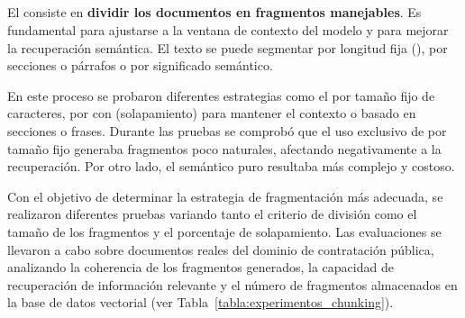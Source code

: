 \subsection{}

El  consiste en \textbf{dividir los documentos en fragmentos manejables}. Es fundamental para ajustarse a la ventana de contexto del modelo y para mejorar la recuperación semántica. El texto se puede segmentar por longitud fija (), por secciones o párrafos o por significado semántico.

En este proceso se probaron diferentes estrategias como el  por tamaño fijo de caracteres, por  con  (solapamiento) para mantener el contexto o basado en secciones o frases. Durante las pruebas se  comprobó que el uso exclusivo de  por tamaño fijo generaba fragmentos poco naturales, afectando negativamente a la recuperación. Por otro lado, el  semántico puro resultaba más complejo y costoso.

Con el objetivo de determinar la estrategia de fragmentación más adecuada, se realizaron diferentes pruebas variando tanto el criterio de división como el tamaño de los fragmentos y el porcentaje de solapamiento. Las evaluaciones se llevaron a cabo sobre documentos reales del dominio de contratación pública, analizando la coherencia de los fragmentos generados, la capacidad de recuperación de información relevante y el número de fragmentos almacenados en la base de datos vectorial (ver Tabla~\ref{tabla:experimentos_chunking}).

